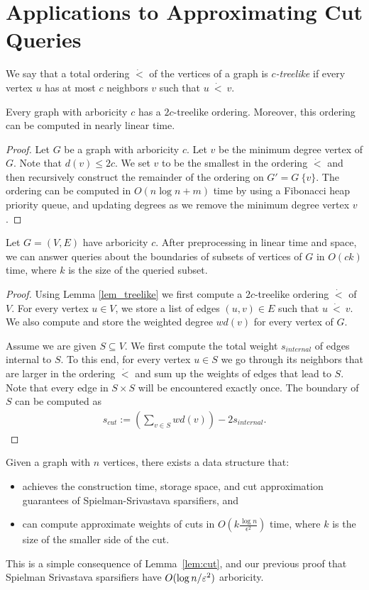\section{Applications to Approximating Cut Queries}

\begin{definition}
	We say that a total ordering $\dot{<}$ of the vertices of a graph is \emph{$c$-treelike} if every vertex $u$ has at most $c$ neighbors $v$ such that $u~\dot{<}~v$. 
\end{definition}
\begin{lemma}
	\label{lem_treelike}
	Every graph with arboricity $c$ has a $2c$-treelike ordering.
  Moreover, this ordering can be computed in nearly linear time.
\end{lemma}
\begin{proof}
	Let $G$ be a graph with arboricity $c$.
	Let $v$ be the minimum degree vertex of $G$.
	Note that $d(v) \leq 2c$.
	We set $v$ to be the smallest in the ordering $\dot{<}$ and then
  recursively construct the remainder of the ordering on $G' = G \
  \{v\}$. The ordering can be computed in $O(n \log n + m)$ time by
  using a Fibonacci heap priority queue, and updating degrees as we
  remove the minimum degree vertex $v$.
\end{proof} 
\begin{lemma} \label{lem:cut}
	Let $G = (V, E)$ have arboricity $c$.
	After preprocessing in linear time and space, we can answer queries about the boundaries of subsets of vertices of $G$ in $O(ck)$ time, where $k$ is the size of the queried subset.
\end{lemma}
\begin{proof}
	Using Lemma \ref{lem_treelike} we first compute a $2c$-treelike ordering $\dot{<}$ of $V$.
	For every vertex $u \in V$, we store a list of edges $(u, v) \in E$ such that $u~\dot{<}~v$.
	We also compute and store the weighted degree $wd(v)$ for every vertex of $G$.
	
	Assume we are given $S \subseteq V$.
	We first compute the total weight $s_{internal}$ of edges internal to $S$.
	To this end, for every vertex $u \in S$ we go through its neighbors that are larger in the ordering $\dot{<}$ and sum up the weights of edges that lead to $S$.
	Note that every edge in $S \times S$ will be encountered exactly once.
	The boundary of $S$ can be computed as
	\begin{align*}
		s_{cut} := \left(\sum_{v \in S} wd(v)\right) - 2s_{internal}. 
	\end{align*}
\end{proof}
\begin{theorem}\label{thm:cut-query}
	Given a graph with $n$ vertices, there exists a data structure that:
	\begin{itemize}
	  \item achieves the construction time, storage space, and cut approximation guarantees of Spielman-Srivastava sparsifiers, and
	  \item can compute approximate weights of cuts in $O(k \frac{\log n}{\epsilon^2})$ time, where $k$ is the size of the smaller side of the cut.
	\end{itemize}
\end{theorem}

This is a simple consequence of Lemma~\ref{lem:cut}, and our previous proof that Spielman Srivastava
sparsifiers have $O(\log n / \varepsilon^2)$ arboricity.
